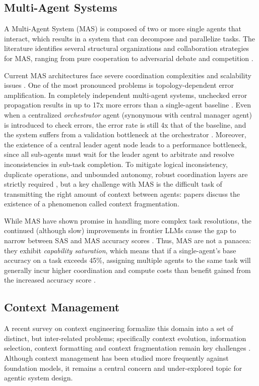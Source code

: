 \documentclass[conference]{IEEEtran}
\begin{document}
\subsection{Multi-Agent Systems}
A Multi-Agent System (MAS) is composed of two or more single agents that interact, which results in
a system that can decompose and parallelize tasks.
The literature identifies several structural organizations and collaboration strategies 
for MAS, ranging from pure cooperation to adversarial debate and competition
\cite{yarmohammadtoosky_llm-powered_2026, taleb_expansion-contraction_2026}.

Current MAS architectures face severe coordination complexities and scalability issues 
\cite{yarmohammadtoosky_llm-powered_2026, sampath_adaptive_nodate}. 
One of the most pronounced problems is topology-dependent error amplification. 
In completely independent multi-agent systems, unchecked error propagation results in up to 17x 
more errors than a single-agent baseline \cite{kim_towards_2026}. 
Even when a centralized \emph{orchestrator} agent (synonymous with central manager agent) 
is introduced to check errors, the error rate is still 4x that of the baseline, 
and the system suffers from a validation bottleneck at the orchestrator
\cite{kim_towards_2026, zhang_agentorchestra_2026}.
Moreover, the existence of a central leader agent node leads to a performance bottleneck, since
all sub-agents must wait for the leader agent to arbitrate and resolve inconsistencies in sub-task
completion.
To mitigate logical inconsistency, duplicate operations, and unbounded autonomy, 
robust coordination layers are strictly required \cite{adimulam_orchestration_2026, ruan_aorchestra_2026},
but a key challenge with MAS is the difficult task of transmitting the right amount of context 
between agents: papers discuss the existence of a phenomenon called context fragmentation.

While MAS have shown promise in handling more complex task resolutions, the continued (although
slow) improvements in frontier LLMs cause the gap to narrow between SAS and MAS accuracy scores
\cite{gao_single-agent_2025}.
Thus, MAS are not a panacea: they exhibit \emph{capability saturation},
which means that if a single-agent's base accuracy on a task exceeds 45\%, 
assigning multiple agents to the same task will generally incur higher coordination 
and compute costs than benefit gained from the increased accuracy score \cite{kim_towards_2026}.

\subsection{Context Management}
A recent survey on context engineering formalize this domain into a set of distinct, but
inter-related problems; 
specifically context evolution, information selection, context formatting and context fragmentation
remain key challenges \cite{mei_context_survey_2025}.
Although context management has been studied more frequently against foundation models,
it remains a central concern and under-explored topic for agentic system design.
\end{document}
